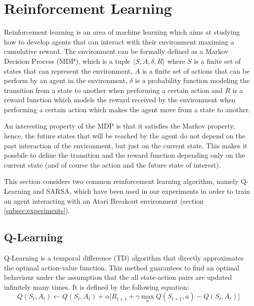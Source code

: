 \section{Reinforcement Learning}
Reinforcement learning \cite{Suttonrl18} is an area of machine learning
which aims at studying how to develop agents that can interact with
their environment maximing a cumulative reward. The environment can be
formally defined as a Markov Decision Process (MDP), which is a tuple
$\langle S, A, \delta, R \rangle$ where $S$ is a finite set of states that can represent
the environment, $A$ is a finite set of actions that can be perform by
an agent in the environment, $\delta$ is a probability function modeling
the transition from a state to another when performing a certain action and
$R$ is a reward function which models the reward received by the environment
when performing a certain action which makes the agent move from a state
to another.

An interesting property of the MDP is that it satisfies the Markov property,
hence, the future states that will be reached by the agent do not depend
on the past interaction of the environment, but just on the current state.
This makes it possbile to define the transition and the reward function
depending only on the current state (and of course the action and the future
state of interest).

This section considers two common reinforcement learning algorithm,
namely Q-Learning and SARSA, which have been used in our experiments
in order to train an agent interacting with an Atari Breakout environment
(section \ref{subsec:experiments}).

\subsection{Q-Learning}
Q-Learning is a temporal difference (TD) algorithm that directly approximates
the optimal action-value
function. This method guarantees to find an optimal behaviour under the
assumption that the all state-action pairs are updated infinitely many times. It is
defined \cite{Suttonrl18} by the following equation:
\begin{equation}
    \label{eq:qlearning-update-function}
    Q(S_t, A_t) \leftarrow Q(S_t, A_t) + \alpha \Big[ R_{t+1} +
        \gamma \max_{a} Q(S_{t+1}, a) - Q(S_t, A_t) \Big]
\end{equation}

